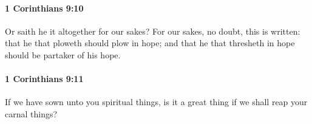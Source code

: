 		\paragraph{1 Corinthians 9:10} %
			\label{1CORINTHIANS-9-10}

			Or saith he it altogether for our sakes?  For our sakes, no doubt, this is written: that he that ploweth should plow in hope; and that he that thresheth in hope should be partaker of his hope.

			\begin{framed}
			\scriptsize
				\begin{compactdesc}
					\item[SBLG] 
				\end{compactdesc}
			\end{framed}

		\paragraph{1 Corinthians 9:11} %
			\label{1CORINTHIANS-9-11}

			If we have sown unto you spiritual things, is it a great thing if we shall reap your carnal things?

